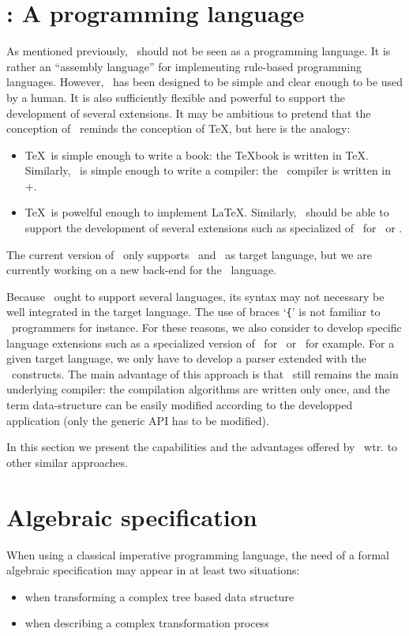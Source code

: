 \newpage
\section{\TOM: A programming language}

As mentioned previously, \TOM\ should not be seen as a programming
language. It is rather an ``assembly language'' for implementing
rule-based programming languages. 
However, \TOM\ has been designed to be simple and clear enough
to be used by a human. It is also sufficiently flexible and powerful
to support the development of several extensions.
It may be ambitious to pretend that the conception of \TOM\ reminds
the conception of \TeX, but here is the analogy:
\begin{itemize}
\item \TeX\ is simple enough to write a book: the {\TeX}book is
  written in \TeX.
  Similarly, \TOM\ is simple enough to write a compiler: the \TOM\
  compiler is written in \Java+\TOM.
\item \TeX\ is powelful enough to implement \LaTeX. 
  Similarly, \TOM\ should be able to support the development of
  several extensions such as specialized of \TOM\ for \Java\ or \Eiffel.
\end{itemize}

The current version of \TOM\ only supports \C\ and \Java\ as target
language, but we are currently working on a new back-end for the
\Eiffel\ language.

Because \TOM\ ought to support several languages, its syntax may
not necessary be well integrated in the target language. The use of
braces `\texttt{\{}' is not familiar to \Eiffel\ programmers for instance.
For these reasons, we also consider to develop specific language
extensions such as a specialized version of \TOM\ for \Java\ or \Eiffel\
for example. 
For a given target language, we only have to develop a parser extended
with the \TOM\ constructs.
The main advantage of this approach is that \TOM\ still remains the
main underlying compiler: the compilation algorithms are written only
once, and the term data-structure can be easily modified according to
the developped application (only the generic API has to be modified).

In this section we present the capabilities and the advantages
offered by \TOM\ wtr. to other similar approaches.

\section{Algebraic specification}
When using a classical imperative programming language, the need of
a formal algebraic specification may appear in at least two
situations: 
\begin{itemize}
\item when transforming a complex tree based data structure
\item when describing a complex transformation process
\end{itemize}

